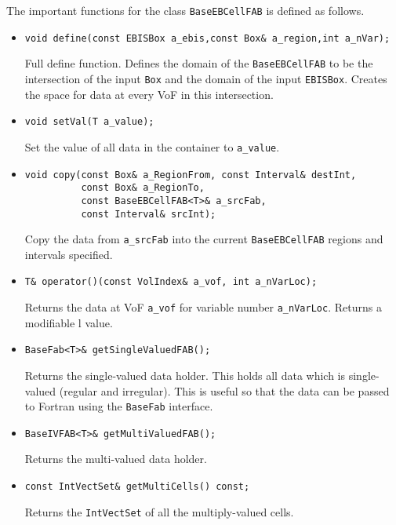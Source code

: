 The important functions for the class {\tt BaseEBCellFAB} is defined as follows.
\begin{itemize}
\item \begin{verbatim}
void define(const EBISBox a_ebis,const Box& a_region,int a_nVar);
\end{verbatim}
Full define function.  Defines the domain of the {\tt BaseEBCellFAB}
to be the intersection of the input {\tt Box} and the domain
of the input {\tt EBISBox}.   Creates the space for data at 
every VoF in this intersection.

\item \begin{verbatim}
void setVal(T a_value);
\end{verbatim}
Set the value of all data in the container to \verb/a_value/.

\item \begin{verbatim}
void copy(const Box& a_RegionFrom, const Interval& destInt,
          const Box& a_RegionTo,        
          const BaseEBCellFAB<T>& a_srcFab,
          const Interval& srcInt);         
\end{verbatim}
Copy the data from \verb/a_srcFab/ into the
current {\tt BaseEBCellFAB} regions and intervals specified.

\item \begin{verbatim}
T& operator()(const VolIndex& a_vof, int a_nVarLoc);
\end{verbatim}
Returns the data at VoF \verb/a_vof/ for variable number
\verb/a_nVarLoc/.  Returns a modifiable l value.

\item \begin{verbatim}
BaseFab<T>& getSingleValuedFAB();
\end{verbatim}
Returns the single-valued data holder.  This holds all data which is
single-valued (regular and irregular).  This is useful so
that the data can be passed to Fortran using the {\tt BaseFab} interface.

\item \begin{verbatim}
BaseIVFAB<T>& getMultiValuedFAB();
\end{verbatim}
Returns the multi-valued data holder. 

\item \begin{verbatim}
const IntVectSet& getMultiCells() const;
\end{verbatim}
Returns the {\tt IntVectSet}  of all the multiply-valued cells.

\end{itemize}

